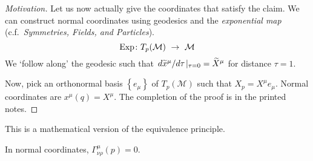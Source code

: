 \begin{proof}[Motivation]
  Let us now actually give the coordinates that satisfy the claim.
  We can construct normal coordinates using geodesics and the \emph{exponential map} (c.f.~\emph{Symmetries, Fields, and Particles}).
  \begin{equation}
    \text{Exp} \colon T_p(\mathcal{M}) \ \to\  \mathcal{M} \\
  \end{equation}
  We `follow along' the geodesic such that $\flatfrac{d \widetilde x^\mu}{d \tau} \rvert_{\tau = 0} = \widetilde X^\mu$ for distance $\tau = 1$.
  \begin{figure}[tbhp]
    \centering
    \def\svgwidth{0.4\columnwidth}
    
    \caption{}
    \label{fig:l10f2}
  \end{figure}
  Now, pick an orthonormal basis $\left\{ e_\mu \right\}$ of $T_p(\mathcal{M})$ such that $X_p = X^\mu e_\mu$. Normal coordinates are $x^\mu(q) = X^\mu$.
  The completion of the proof is in the printed notes.
\end{proof}
\begin{leftbar}
  \begin{remark}
    This is a mathematical version of the equivalence principle.
  \end{remark}
\end{leftbar}
\begin{corollary}
  In normal coordinates, $\Gamma^\mu_{\nu\rho}(p) =0$.
\end{corollary}
